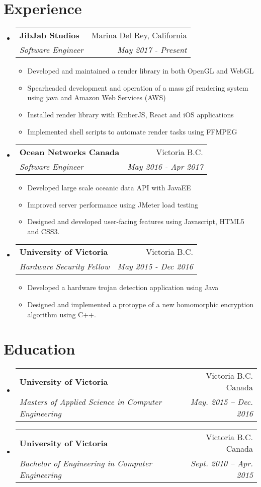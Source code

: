 \documentclass[letterpaper,11pt]{article}
\makeatletter
\newcommand{\resumeSubheading}[4]{
	\vspace{-1pt}\item
	\begin{tabular*}{0.97\textwidth}{l@{\extracolsep{\fill}}r}
		\textbf{#1} & #2 \\
		\textit{\small#3} & \textit{\small #4} \\
	\end{tabular*}\vspace{-5pt}
}
\newcommand{\resumeSubHeadingListStart}{\begin{itemize}[leftmargin=*]}
\newcommand{\resumeSubHeadingListEnd}{\end{itemize}}
\makeatother
\begin{document}
	
	\vspace*{-6mm}
	\section{Experience}
	\resumeSubHeadingListStart
	
	\resumeSubheading
	{JibJab Studios}{Marina Del Rey, California}
	{Software Engineer}{May 2017 - Present}
	\begin{itemize}
		\setlength\itemsep{0em}
		\item Developed and maintained a render library in both OpenGL and WebGL
		\item Spearheaded development and operation of a mass gif rendering system using java and Amazon Web Services (AWS)
		\item Installed render library with EmberJS, React and iOS applications
		\item Implemented shell scripts to automate render tasks using FFMPEG
	\end{itemize}
	
	\resumeSubheading
	{Ocean Networks Canada}{Victoria B.C.}
	{Software Engineer}{May 2016 - Apr 2017}
	\begin{itemize}
		\setlength\itemsep{0em}
		\item Developed large scale oceanic data API with JavaEE
		\item Improved server performance using JMeter load testing
		\item Designed and developed user-facing features using Javascript, HTML5 and CSS3.
	\end{itemize}
	
	\resumeSubheading
	{University of Victoria}{Victoria B.C.}
	{Hardware Security Fellow}{May 2015 - Dec 2016}
	\begin{itemize}
		\setlength\itemsep{0em}
		\item Developed a hardware trojan detection application using Java
		\item Designed and implemented a protoype of a new homomorphic encryption algorithm using C++.
	\end{itemize}
	\resumeSubHeadingListEnd
	
	\section{Education}
	\resumeSubHeadingListStart
	\resumeSubheading
	{University of Victoria}{Victoria B.C. Canada}
	{Masters of Applied Science in Computer Engineering}{May. 2015 -- Dec. 2016}
	\resumeSubheading
	{University of Victoria}{Victoria B.C. Canada}
	{Bachelor of Engineering in Computer Engineering}{Sept. 2010 -- Apr. 2015}
	\resumeSubHeadingListEnd
\end{document}
